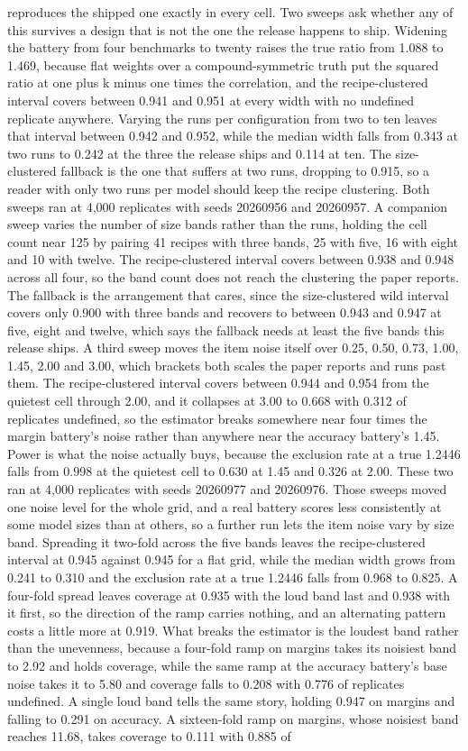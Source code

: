 reproduces the shipped one exactly in every cell. Two sweeps ask whether any of this survives a design that is not the one the release happens to ship. Widening the battery from four benchmarks to twenty raises the true ratio from 1.088 to 1.469, because flat weights over a compound-symmetric truth put the squared ratio at one plus k minus one times the correlation, and the recipe-clustered interval covers between 0.941 and 0.951 at every width with no undefined replicate anywhere. Varying the runs per configuration from two to ten leaves that interval between 0.942 and 0.952, while the median width falls from 0.343 at two runs to 0.242 at the three the release ships and 0.114 at ten. The size-clustered fallback is the one that suffers at two runs, dropping to 0.915, so a reader with only two runs per model should keep the recipe clustering. Both sweeps ran at 4,000 replicates with seeds 20260956 and 20260957. A companion sweep varies the number of size bands rather than the runs, holding the cell count near 125 by pairing 41 recipes with three bands, 25 with five, 16 with eight and 10 with twelve. The recipe-clustered interval covers between 0.938 and 0.948 across all four, so the band count does not reach the clustering the paper reports. The fallback is the arrangement that cares, since the size-clustered wild interval covers only 0.900 with three bands and recovers to between 0.943 and 0.947 at five, eight and twelve, which says the fallback needs at least the five bands this release ships. A third sweep moves the item noise itself over 0.25, 0.50, 0.73, 1.00, 1.45, 2.00 and 3.00, which brackets both scales the paper reports and runs past them. The recipe-clustered interval covers between 0.944 and 0.954 from the quietest cell through 2.00, and it collapses at 3.00 to 0.668 with 0.312 of replicates undefined, so the estimator breaks somewhere near four times the margin battery's noise rather than anywhere near the accuracy battery's 1.45. Power is what the noise actually buys, because the exclusion rate at a true 1.2446 falls from 0.998 at the quietest cell to 0.630 at 1.45 and 0.326 at 2.00. These two ran at 4,000 replicates with seeds 20260977 and 20260976. Those sweeps moved one noise level for the whole grid, and a real battery scores less consistently at some model sizes than at others, so a further run lets the item noise vary by size band. Spreading it two-fold across the five bands leaves the recipe-clustered interval at 0.945 against 0.945 for a flat grid, while the median width grows from 0.241 to 0.310 and the exclusion rate at a true 1.2446 falls from 0.968 to 0.825. A four-fold spread leaves coverage at 0.935 with the loud band last and 0.938 with it first, so the direction of the ramp carries nothing, and an alternating pattern costs a little more at 0.919. What breaks the estimator is the loudest band rather than the unevenness, because a four-fold ramp on margins takes its noisiest band to 2.92 and holds coverage, while the same ramp at the accuracy battery's base noise takes it to 5.80 and coverage falls to 0.208 with 0.776 of replicates undefined. A single loud band tells the same story, holding 0.947 on margins and falling to 0.291 on accuracy. A sixteen-fold ramp on margins, whose noisiest band reaches 11.68, takes coverage to 0.111 with 0.885 of 